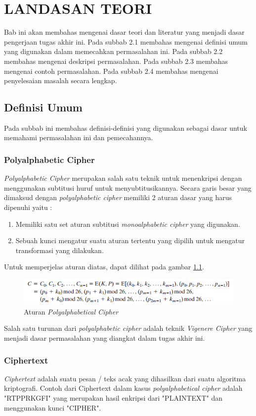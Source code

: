 	\chapter{LANDASAN TEORI}
	Bab ini akan membahas mengenai dasar teori dan literatur yang menjadi dasar pengerjaan tugas akhir ini. Pada subbab 2.1 membahas mengenai definisi umum yang digunakan dalam memecahkan permasalahan ini. Pada subbab 2.2 membahas mengenai deskripsi permasalahan. Pada subbab 2.3 membahas mengenai contoh permasalahan. Pada subbab 2.4 membahas mengenai penyelesaian masalah secara lengkap.
	\section{Definisi Umum}
	Pada subbab ini membahas definisi-definisi yang digunakan sebagai dasar untuk memahami permasalahan ini dan pemecahannya.	
	\subsection{Polyalphabetic Cipher}
	\textit{Polyalphabetic Cipher }merupakan salah satu teknik untuk menenkripsi dengan menggunakan subtitusi huruf untuk menyubtitusikannya. Secara garis besar yang dimaksud dengan \textit{polyalphabetic cipher} memiliki 2 aturan dasar yang harus dipenuhi yaitu :
	\begin{enumerate}
		\item Memiliki satu set aturan subtitusi \textit{monoalphabetic cipher} yang digunakan.
		\item Sebuah kunci mengatur suatu aturan tertentu yang dipilih untuk mengatur transformasi yang dilakukan.
	\end{enumerate}
	Untuk memperjelas aturan diatas, dapat dilihat pada gambar \ref{fig:polyalphabeticalcipher}.
	\begin{figure}[H]
		\centering
		\includegraphics[scale=0.85]{images/bab2/poly.png}
		\caption{Aturan \textit{Polyalphabetical Cipher}}
		\label{fig:polyalphabeticalcipher}
	\end{figure}
	Salah satu turunan dari \textit{polyalphabetic cipher} adalah teknik \textit{Vigenere Cipher} yang menjadi dasar permasalahan yang diangkat dalam tugas akhir ini.\cite{stallings_computer_2015}
	
	\subsection{Ciphertext}
	\textit{Ciphertext} adalah suatu pesan / teks acak yang dihasilkan dari suatu algoritma kriptografi. 
	Contoh dari Ciphertext dalam kasus \textit{polyalphabetical cipher} adalah "RTPPRKGFI" yang merupakan hasil enkripsi dari "PLAINTEXT" dan menggunakan kunci "CIPHER".\cite{william_crytography_2011}
	
